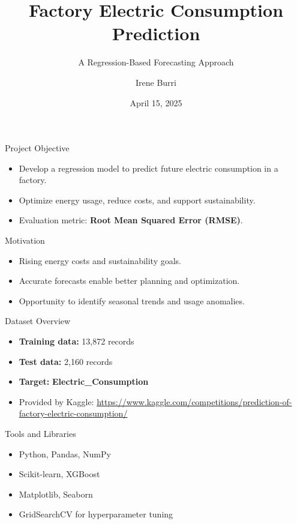 \documentclass{beamer}
\title[Factory Electric Consumption Prediction]{Factory Electric Consumption Prediction}
\subtitle{A Regression-Based Forecasting Approach}
\author{Irene Burri}
\date{April 15, 2025}
\begin{document}
\begin{frame}
  \titlepage
\end{frame}

\begin{frame}{Project Objective}
  \begin{itemize}
    \item Develop a regression model to predict future electric consumption in a factory.
    \item Optimize energy usage, reduce costs, and support sustainability.
    \item Evaluation metric: \textbf{Root Mean Squared Error (RMSE)}.
  \end{itemize}
\end{frame}

\begin{frame}{Motivation}
  \begin{itemize}
    \item Rising energy costs and sustainability goals.
    \item Accurate forecasts enable better planning and optimization.
    \item Opportunity to identify seasonal trends and usage anomalies.
  \end{itemize}
\end{frame}

\begin{frame}{Dataset Overview}
  \begin{itemize}
    \item \textbf{Training data:} 13,872 records
    \item \textbf{Test data:} 2,160 records
    \item \textbf{Target:} \textbf{Electric\_Consumption}
    \item Provided by Kaggle: \url{https://www.kaggle.com/competitions/prediction-of-factory-electric-consumption/}
  \end{itemize}
\end{frame}

\begin{frame}{Tools and Libraries}
  \begin{itemize}
    \item Python, Pandas, NumPy
    \item Scikit-learn, XGBoost
    \item Matplotlib, Seaborn
    \item GridSearchCV for hyperparameter tuning
  \end{itemize}
\end{frame}
\end{document}
